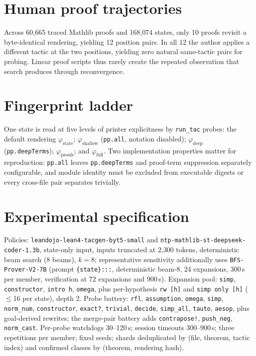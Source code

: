 \documentclass[11pt]{article}
\begin{document}
\section{Human proof trajectories}
\label{app:human}
Across 60{,}665 traced Mathlib proofs and 168{,}074 states, only 10 proofs
revisit a byte-identical rendering, yielding 12 position pairs. In all 12 the
author applies a different tactic at the two positions, yielding zero natural
same-tactic pairs for probing. Linear proof scripts thus rarely create the repeated
observation that search produces through reconvergence.

\section{Fingerprint ladder}
\label{app:ladder}
One state is read at five levels of printer explicitness by \texttt{run\_tac}
probes: the default rendering $\varphi_{\text{state}}$;
$\varphi_{\text{shallow}}$ (\texttt{pp.all}, notation disabled);
$\varphi_{\text{deep}}$ (\texttt{pp.deepTerms}); $\varphi_{\text{proofs}}$; and
$\varphi_{\text{full}}$. Two implementation properties matter for reproduction:
\texttt{pp.all} leaves \texttt{pp.deepTerms} and proof-term suppression
separately configurable, and module identity must be excluded from executable digests or
every cross-file pair separates trivially.

\section{Experimental specification}
\label{app:spec}
Policies: \texttt{leandojo-\allowbreak lean4-\allowbreak tacgen-\allowbreak byt5-\allowbreak small} and
\texttt{ntp-\allowbreak mathlib-\allowbreak st-\allowbreak deepseek-\allowbreak coder-\allowbreak 1.3b}, state-only input, inputs truncated
at 2{,}300 tokens, deterministic beam search (8 beams), $k{=}8$; representative
sensitivity additionally uses
\texttt{BFS-\allowbreak Prover-\allowbreak V2-\allowbreak 7B} (prompt
\texttt{\{state\}:::}, deterministic beam-8, 24 expansions, 300\,s per
member, verification at 72 expansions and 900\,s). Expansion
pool: \texttt{simp}, \texttt{constructor}, \texttt{intro h}, \texttt{omega},
plus per-hypothesis \texttt{rw [h]} and \texttt{simp only [h]} ($\leq$16 per
state), depth 2. Probe battery: \texttt{rfl}, \texttt{assumption},
\texttt{omega}, \texttt{simp}, \texttt{norm\_num}, \texttt{constructor},
\texttt{exact?}, \texttt{trivial}, \texttt{decide}, \texttt{simp\_all},
\texttt{tauto}, \texttt{aesop}, plus goal-derived rewrites; the merge-pair
battery adds \texttt{contrapose!}, \texttt{push\_neg}, \texttt{norm\_cast}.
Per-probe watchdogs 30--120\,s; session timeouts 300--900\,s; three repetitions
per member; fixed seeds; shards deduplicated by (file, theorem, tactic index)
and confirmed classes by (theorem, rendering hash).
\end{document}
